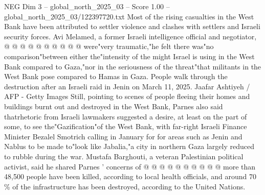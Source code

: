 \begin{textsample}{NEG Dim 3 – global\_north\_2025\_03 – Score 1.00 – global\_north\_2025\_03/122397720.txt}
Most of the rising casualties in the West Bank have been attributed to settler violence and clashes with settlers and Israeli security forces.
Avi Melamed, a former Israeli intelligence official and negotiator, @ @ @ @ @ @ @ @ @ @ were"very traumatic,"he felt there was"no comparison"between either the"intensity of the might Israel is using in the West Bank compared to Gaza,"nor in the seriousness of the threat"that militants in the West Bank pose compared to Hamas in Gaza.
People walk through the destruction after an Israeli raid in Jenin on March 11, 2025.
Jaafar Ashtiyeh / AFP - Getty Images Still, pointing to scenes of people fleeing their homes and buildings burnt out and destroyed in the West Bank, Parnes also said thatrhetoric from Israeli lawmakers suggested a desire, at least on the part of some, to see the"Gazification"of the West Bank, with far-right Israeli Finance Minister Bezalel Smotrich calling in January for for areas such as Jenin and Nablus to be made to"look like Jabalia,"a city in northern Gaza largely reduced to rubble during the war.
Mustafa Barghouti, a veteran Palestinian political activist, said he shared Parnes ' concerns of @ @ @ @ @ @ @ @ @ @ more than 48,500 people have been killed, according to local health officials, and around 70 \% of the infrastructure has been destroyed, according to the United Nations.

\end{textsample}
